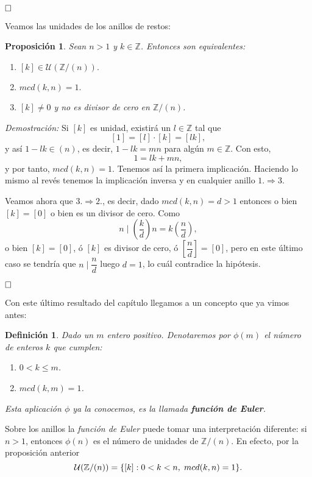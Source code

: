 \documentclass[12pt]{article}
\newtheorem{proposition}[theorem]{Proposición}
\newtheorem{definition}[theorem]{Definición}
\begin{document}
$\hfill \square$

Veamos las unidades de los anillos de restos:

\begin{proposition} Sean $n >1$ y $k \in \mathbb{Z}$. Entonces son equivalentes: \begin{enumerate}
\item $[k] \in \mathcal{U}(\mathbb{Z}/(n)).$
\item $mcd (k,n) = 1.$
\item $[k] \neq 0$ y no es divisor de cero en $\mathbb{Z}/(n)$.
\end{enumerate}
\end{proposition}
\emph{Demostración: } Si $[k]$ es unidad, existirá un $l \in \mathbb{Z}$ tal que $$[1] = [l] \cdot [k] = [lk],$$ y así $1-lk \in (n)$, es decir, $1-lk = mn$ para algún $m \in \mathbb{Z}$. Con esto, $$1 = lk  + mn,$$ y por tanto, $mcd(k,n) = 1$. Tenemos así la primera implicación. Haciendo lo mismo al revés tenemos la implicación inversa y en cualquier anillo $1.\Rightarrow 3.$

Veamos ahora que $3. \Rightarrow 2.$, es decir, dado $mcd(k,n) = d>1$ entonces o bien $[k] = [0]$ o bien es un divisor de cero. Como $$n \mid \left( \dfrac{k}{d}\right) n = k\left( \dfrac{n}{d}\right),$$ o bien $[k] = [0]$, ó $[k]$ es divisor de cero, ó $\left[\dfrac{n}{d} \right] = [0]$, pero en este último caso se tendría que $n \mid \dfrac{n}{d}$ luego $d = 1$, lo cuál contradice la hipótesis.

$\hfill \square$

Con este último resultado del capítulo llegamos a un concepto que ya vimos antes:
 
\begin{definition} Dado un $m$ entero positivo. Denotaremos por $\phi (m)$ el número de enteros $k$ que cumplen: \begin{enumerate}
\item $0 < k \leq m$.
\item $mcd(k,m) = 1$.
\end{enumerate}
Esta aplicación $\phi$ ya la conocemos, es la llamada \textbf{función de Euler}.
\end{definition}

Sobre los anillos la \textit{función de Euler} puede tomar una interpretación diferente: si $n>1$, entonces $\phi(n)$ es el número de unidades de $\mathbb{Z}/(n)$. En efecto, por la proposición anterior $$\mathcal{U}(\mathbb{Z}/(n)) = \lbrace [k]: 0 < k < n, \hspace{0.1cm} mcd(k,n) = 1 \rbrace.$$
\end{document}

